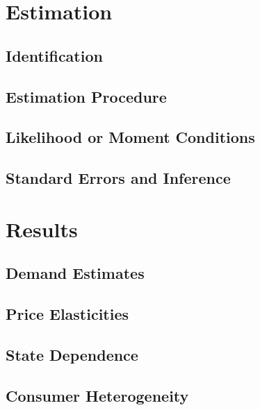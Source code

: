 \documentclass[12pt]{article}
\theoremstyle{definition}
\theoremstyle{remark}
\begin{document}
\section{Estimation}
\label{sec:estimation}

\subsection{Identification}
\label{subsec:identification}

\subsection{Estimation Procedure}
\label{subsec:estimation-procedure}

\subsection{Likelihood or Moment Conditions}

%

\subsection{Standard Errors and Inference}



\section{Results}
\label{sec:results}

\subsection{Demand Estimates}

\subsection{Price Elasticities}

\subsection{State Dependence}

\subsection{Consumer Heterogeneity}
\end{document}
